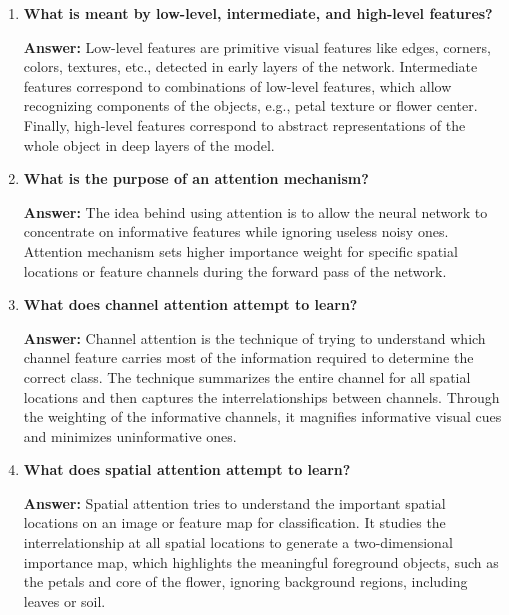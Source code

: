 \documentclass[10pt]{article}
\begin{document}
\begin{enumerate}
\vspace{5mm}

\item \textbf{What is meant by low-level, intermediate, and high-level features?}

\textbf{Answer:} Low-level features are primitive visual features like edges, corners, colors, textures, etc., detected in early layers of the network. Intermediate features correspond to combinations of low-level features, which allow recognizing components of the objects, e.g., petal texture or flower center. Finally, high-level features correspond to abstract representations of the whole object in deep layers of the model.

\vspace{5mm}

\item \textbf{What is the purpose of an attention mechanism?}

\textbf{Answer:} The idea behind using attention is to allow the neural network to concentrate on informative features while ignoring useless noisy ones. Attention mechanism sets higher importance weight for specific spatial locations or feature channels during the forward pass of the network.

\vspace{5mm}

\item \textbf{What does channel attention attempt to learn?}

\textbf{Answer:} Channel attention is the technique of trying to understand which channel feature carries most of the information required to determine the correct class. The technique summarizes the entire channel for all spatial locations and then captures the interrelationships between channels. Through the weighting of the informative channels, it magnifies informative visual cues and minimizes uninformative ones.

\vspace{5mm}

\item \textbf{What does spatial attention attempt to learn?}

\textbf{Answer:} Spatial attention tries to understand the important spatial locations on an image or feature map for classification. It studies the interrelationship at all spatial locations to generate a two-dimensional importance map, which highlights the meaningful foreground objects, such as the petals and core of the flower, ignoring background regions, including leaves or soil.


\end{enumerate}
\end{document}
